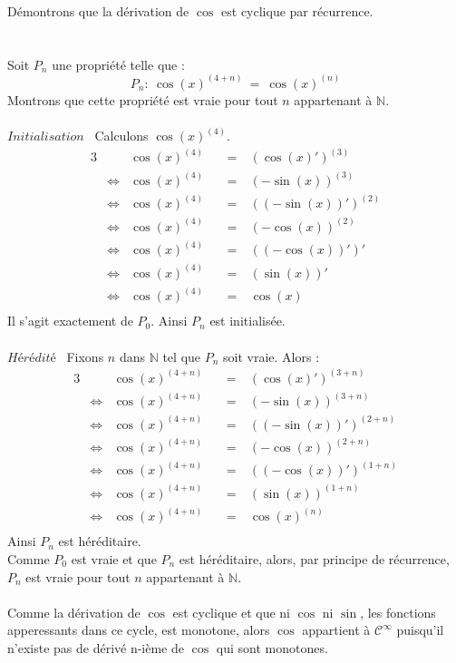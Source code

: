 \documentclass[a4paper,fleqn]{article}
\date{\today}
\begin{document}
Démontrons que la dérivation de $\cos$ est cyclique par récurrence. \\
\\ \\
Soit $P_n$ une propriété telle que :
\[
	P_n :~ \cos(x)^{(4+n)} ~=~ \cos(x)^{(n)}
\]
Montrons que cette propriété est vraie pour tout $n$ appartenant à $\mathbb{N}$. \\ \\
$\textit{Initialisation}$~ Calculons $\cos(x)^{(4)}$.
\begin{alignat*}{3}
	&&\cos(x)^{(4)}&&~=~&(\cos(x)')^{(3)} \\
	&\Leftrightarrow&\cos(x)^{(4)}&&~=~& (-\sin(x))^{(3)} \\
	&\Leftrightarrow&\cos(x)^{(4)}&&~=~& ((-\sin(x))')^{(2)}\\
	&\Leftrightarrow&\cos(x)^{(4)}&&~=~& (-\cos(x))^{(2)}\\
	&\Leftrightarrow&\cos(x)^{(4)}&&~=~& ((-\cos(x))')'\\
	&\Leftrightarrow&\cos(x)^{(4)}&&~=~& (\sin(x))'\\
	&\Leftrightarrow&\cos(x)^{(4)}&&~=~& \cos(x)\\
\end{alignat*}
Il s'agit exactement de $P_0$. Ainsi $P_n$ est initialisée. \\ \\
$\textit{Hérédité}$~ Fixons $n$ dans $\mathbb{N}$ tel que $P_n$ soit vraie.
Alors :
\begin{alignat*}{3}
	&&\cos(x)^{(4+n)}&&~=~&(\cos(x)')^{(3+n)} \\
	&\Leftrightarrow&\cos(x)^{(4+n)}&&~=~& (-\sin(x))^{(3+n)} \\
	&\Leftrightarrow&\cos(x)^{(4+n)}&&~=~& ((-\sin(x))')^{(2+n)}\\
	&\Leftrightarrow&\cos(x)^{(4+n)}&&~=~& (-\cos(x))^{(2+n)}\\
	&\Leftrightarrow&\cos(x)^{(4+n)}&&~=~& ((-\cos(x))')^{(1+n)}\\
	&\Leftrightarrow&\cos(x)^{(4+n)}&&~=~& (\sin(x))^{(1+n)}\\
	&\Leftrightarrow&\cos(x)^{(4+n)}&&~=~& \cos(x)^{(n)}\\
\end{alignat*}
Ainsi $P_n$ est héréditaire. \\
Comme $P_0$ est vraie et que $P_n$ est héréditaire, alors, par principe de récurrence, $P_n$ est vraie pour tout $n$ appartenant à $\mathbb{N}$. \\ \\
Comme la dérivation de $\cos$ est cyclique et que ni $\cos$ ni $\sin$, les fonctions apperessants dans ce cycle, est monotone, alors $\cos$ appartient à $\mathcal{C}^\infty$ puisqu'il n'existe pas de dérivé n-ième de $\cos$ qui sont monotones.
\end{document}
